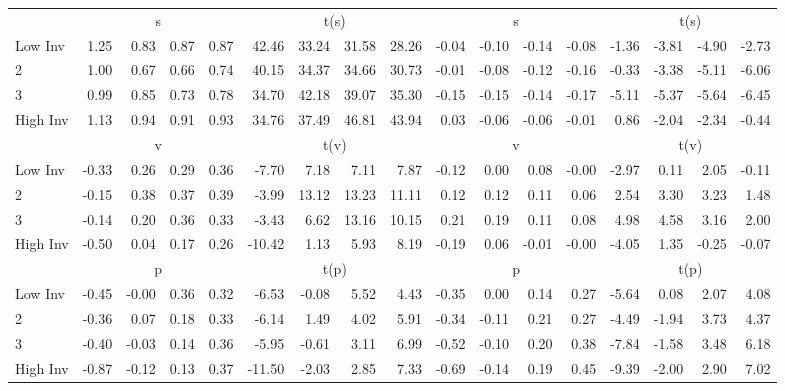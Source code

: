 \begin{table}[!ht]
\begin{tabular}{lrrrrrrrrrrrrrrrr}
  
     & \multicolumn{4}{c}{s} & \multicolumn{4}{c}{t(s)}  & \multicolumn{4}{c}{s} & \multicolumn{4}{c}{t(s)}   \\
     \cmidrule(r){2-5} \cmidrule(r){6-9}  \cmidrule(r){10-13} \cmidrule(r){14-17} 
    Low Inv  & 1.25  & 0.83  & 0.87  & 0.87  & 42.46  & 33.24  & 31.58  & 28.26  & -0.04  & -0.10  & -0.14  & -0.08  & -1.36  & -3.81  & -4.90  & -2.73   \\
    2  & 1.00  & 0.67  & 0.66  & 0.74  & 40.15  & 34.37  & 34.66  & 30.73  & -0.01  & -0.08  & -0.12  & -0.16  & -0.33  & -3.38  & -5.11  & -6.06   \\
    3  & 0.99  & 0.85  & 0.73  & 0.78  & 34.70  & 42.18  & 39.07  & 35.30  & -0.15  & -0.15  & -0.14  & -0.17  & -5.11  & -5.37  & -5.64  & -6.45   \\
    High Inv  & 1.13  & 0.94  & 0.91  & 0.93  & 34.76  & 37.49  & 46.81  & 43.94  & 0.03  & -0.06  & -0.06  & -0.01  & 0.86  & -2.04  & -2.34  & -0.44   \\
    
  
     & \multicolumn{4}{c}{v} & \multicolumn{4}{c}{t(v)}  & \multicolumn{4}{c}{v} & \multicolumn{4}{c}{t(v)}   \\
     \cmidrule(r){2-5} \cmidrule(r){6-9}  \cmidrule(r){10-13} \cmidrule(r){14-17} 
    Low Inv  & -0.33  & 0.26  & 0.29  & 0.36  & -7.70  & 7.18  & 7.11  & 7.87  & -0.12  & 0.00  & 0.08  & -0.00  & -2.97  & 0.11  & 2.05  & -0.11   \\
    2  & -0.15  & 0.38  & 0.37  & 0.39  & -3.99  & 13.12  & 13.23  & 11.11  & 0.12  & 0.12  & 0.11  & 0.06  & 2.54  & 3.30  & 3.23  & 1.48   \\
    3  & -0.14  & 0.20  & 0.36  & 0.33  & -3.43  & 6.62  & 13.16  & 10.15  & 0.21  & 0.19  & 0.11  & 0.08  & 4.98  & 4.58  & 3.16  & 2.00   \\
    High Inv  & -0.50  & 0.04  & 0.17  & 0.26  & -10.42  & 1.13  & 5.93  & 8.19  & -0.19  & 0.06  & -0.01  & -0.00  & -4.05  & 1.35  & -0.25  & -0.07   \\
    
  
     & \multicolumn{4}{c}{p} & \multicolumn{4}{c}{t(p)}  & \multicolumn{4}{c}{p} & \multicolumn{4}{c}{t(p)}   \\
     \cmidrule(r){2-5} \cmidrule(r){6-9}  \cmidrule(r){10-13} \cmidrule(r){14-17} 
    Low Inv  & -0.45  & -0.00  & 0.36  & 0.32  & -6.53  & -0.08  & 5.52  & 4.43  & -0.35  & 0.00  & 0.14  & 0.27  & -5.64  & 0.08  & 2.07  & 4.08   \\
    2  & -0.36  & 0.07  & 0.18  & 0.33  & -6.14  & 1.49  & 4.02  & 5.91  & -0.34  & -0.11  & 0.21  & 0.27  & -4.49  & -1.94  & 3.73  & 4.37   \\
    3  & -0.40  & -0.03  & 0.14  & 0.36  & -5.95  & -0.61  & 3.11  & 6.99  & -0.52  & -0.10  & 0.20  & 0.38  & -7.84  & -1.58  & 3.48  & 6.18   \\
    High Inv  & -0.87  & -0.12  & 0.13  & 0.37  & -11.50  & -2.03  & 2.85  & 7.33  & -0.69  & -0.14  & 0.19  & 0.45  & -9.39  & -2.00  & 2.90  & 7.02   \\
    

\end{tabular}
\end{table}
